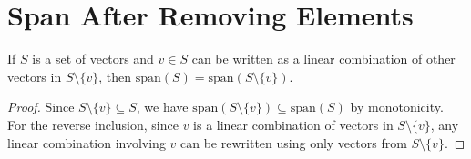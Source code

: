 \section{Span After Removing Elements}

\begin{theorem}
  \label{theorem : span_remove_element}
  If $S$ is a set of vectors and $v \in S$ can be written as a linear combination of other vectors in $S \setminus \{v\}$, then $\text{span}(S) = \text{span}(S \setminus \{v\})$.
\end{theorem}

\begin{proof}
  Since $S \setminus \{v\} \subseteq S$, we have $\text{span}(S \setminus \{v\}) \subseteq \text{span}(S)$ by monotonicity. For the reverse inclusion, since $v$ is a linear combination of vectors in $S \setminus \{v\}$, any linear combination involving $v$ can be rewritten using only vectors from $S \setminus \{v\}$.
\end{proof}
